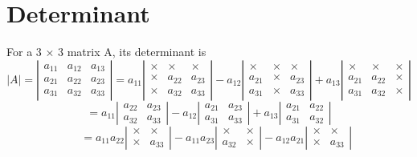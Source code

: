 \documentclass[dvipdfmx]{article}
\begin{document}
\section*{Determinant}
For a 3 × 3 matrix A, its determinant is \\
\[
  |A| = 
    \left|
    \begin{array}{ccc}
      a_{11} & a_{12} & a_{13} \\
      a_{21} & a_{22} & a_{23} \\
      a_{31} & a_{32} & a_{33}
    \end{array}
  \right| =
   a_{11}
  \left|
    \begin{array}{ccc}
      \times & \times & \times \\
      \times & a_{22} & a_{23} \\
      \times & a_{32} & a_{33}
    \end{array}
  \right|  
  - a_{12}
  \left|
    \begin{array}{ccc}
      \times & \times & \times \\
      a_{21} & \times & a_{23} \\
      a_{31} & \times & a_{33}
    \end{array}
  \right| 
  + a_{13}
    \left|
    \begin{array}{ccc}
      \times & \times & \times \\
      a_{21} & a_{22} & \times \\
      a_{31} & a_{32} & \times
    \end{array}
  \right|
\] 
\[
   = a_{11}
     \left|
    \begin{array}{ccc}
      a_{22} & a_{23} \\
      a_{32} & a_{33}
    \end{array}
  \right|  
  - a_{12}
  \left|
    \begin{array}{ccc}
      a_{21} & a_{23} \\
      a_{31} & a_{33}
    \end{array}
  \right| 
  + a_{13}
    \left|
    \begin{array}{ccc}
      a_{21} & a_{22}  \\
      a_{31} & a_{32} 
    \end{array}
  \right|
\] 
\[
  \ \ \ \ \ \ = a_{11} a_{22}
     \left|
    \begin{array}{ccc}
      \times & \times \\
      \times & a_{33}
    \end{array}
  \right|  
  - a_{11} a_{23}
     \left|
    \begin{array}{ccc}
      \times & \times \\
      a_{32} & \times
    \end{array}
  \right|  
  - a_{12} a_{21}
  \left|
    \begin{array}{ccc}
      \times & \times \\
      \times & a_{33}
    \end{array}
  \right| 
   \] 
\end{document}
